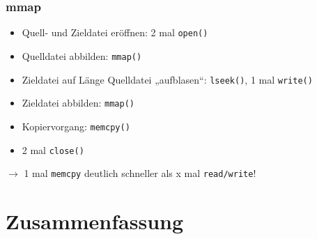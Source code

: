 \subsubsection*{mmap}
\begin{itemize}
\item Quell- und Zieldatei eröffnen: 2 mal \lstinline`open()`
\item Quelldatei abbilden: \lstinline`mmap()`
\item Zieldatei auf Länge Quelldatei „aufblasen“: \lstinline`lseek()`, 1 mal \lstinline`write()`
\item Zieldatei abbilden: \lstinline`mmap()`
\item Kopiervorgang: \lstinline`memcpy()`
\item 2 mal \lstinline`close()`
\end{itemize}
$\to$ 1 mal \lstinline`memcpy` deutlich schneller als x mal \lstinline`read/write`!

\section{Zusammenfassung}
